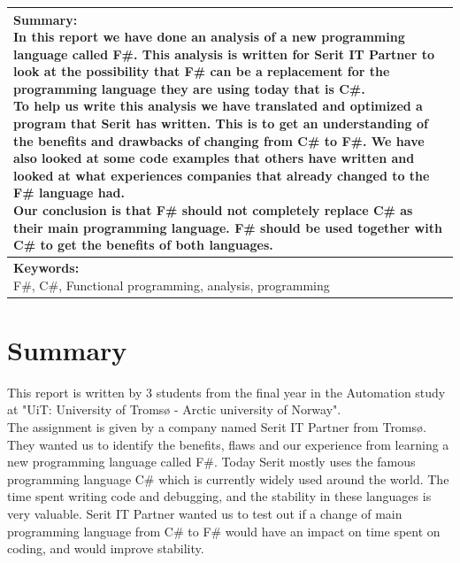 \documentclass[12pt, a4paper]{article}
\begin{document}
\begin{tabularx}{\textwidth}{|X|}
\hline
\pbox{\linewidth}{
\vspace{1mm}
\textbf{Summary:}\\
In this report we have done an analysis of a new programming language called F\#. This analysis is written for Serit IT Partner to look at the possibility that F\# can be a replacement for the programming language they are using today that is C\#.\\[2mm]
To help us write this analysis we have translated and optimized a program that Serit has written. This is to get an understanding of the benefits and drawbacks of changing from C\# to F\#. We have also looked at some code examples that others have written and looked at what experiences  companies that already changed to the F\# language had.\\[2mm]
Our conclusion is that F\# should not completely replace C\# as their main programming language. F\# should be used together with C\# to get the benefits of both languages. 
\vspace{1mm}
}
\\
\hline
\pbox{\linewidth}{
\vspace{1mm}
\textbf{Keywords:}\\
F\#, C\#, Functional programming, analysis, programming
\vspace{1mm}
}
\\

\hline
\end{tabularx}


\newpage
\section*{Summary}
This report is written by 3 students from the final year in the Automation study at "UiT: University of Tromsø - Arctic university of Norway".\\

The assignment is given by a company named Serit IT Partner from Tromsø. They wanted us to identify the benefits, flaws and our experience from learning a new programming language called F\#. Today Serit mostly uses the famous programming language C\# which is currently widely used around the world. The time spent writing code and debugging, and the stability in these languages is very valuable. Serit IT Partner wanted us to test out if a change of main programming language from C\# to F\# would have an impact on time spent on coding, and would improve stability.\\
\end{document}
